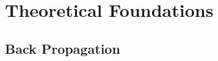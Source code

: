 \section{Theoretical Foundations}
\label{sec:introduction}
\subsection{Back Propagation}
\label{subsec:introduction-definition}
\begin{frame}{\insertsubsection}
    
\end{frame}